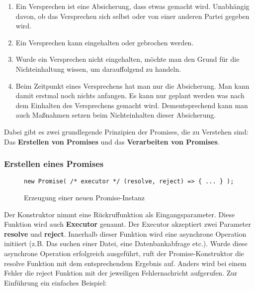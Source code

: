 \begin{enumerate}
    \item Ein Versprechen ist eine Absicherung, dass etwas gemacht wird. Unabhängig davon, ob das Versprechen sich selbst oder von einer anderen Partei gegeben wird.
    
    \item Ein Versprechen kann eingehalten oder gebrochen werden.
    
    \item Wurde ein Versprechen nicht eingehalten, möchte man den Grund für die Nichteinhaltung wissen, um darauffolgend zu handeln.
    
    \item Beim Zeitpunkt eines Versprechens hat man nur die Absicherung. Man kann damit erstmal noch nichts anfangen. Es kann nur geplant werden was nach dem Einhalten des Versprechens gemacht wird. Dementsprechend kann man auch Maßnahmen setzen beim Nichteinhalten dieser Absicherung.
    
\end{enumerate}

\noindent
Dabei gibt es zwei grundlegende Prinzipien der Promises, die zu Verstehen sind: Das \textbf{Erstellen von Promises} und das \textbf{Verarbeiten von Promises}.

\subsubsection{Erstellen eines Promises}

\begin{figure}[H]
\begin{lstlisting}[basicstyle=\small]
new Promise( /* executor */ (resolve, reject) => { ... } );
\end{lstlisting}
\caption{Erzeugung einer neuen Promise-Instanz}
\end{figure}

Der Konstruktor nimmt eine Rückruffunktion als Eingangsparameter. Diese Funktion wird auch \textbf{Executor} genannt.\cite{promise-executor} Der Executor akzeptiert zwei Parameter \textbf{resolve} und \textbf{reject}. Innerhalb dieser Funktion wird eine asynchrone Operation initiiert (z.B. Das suchen einer Datei, eine Datenbankabfrage etc.). Wurde diese asynchrone Operation erfolgreich ausgeführt, ruft der Promise-Konstruktor die resolve Funktion mit dem entsprechendem Ergebnis auf. Anders wird bei einem Fehler die reject Funktion mit der jeweiligen Fehlernachricht aufgerufen. Zur Einführung ein einfaches Beispiel:\\

